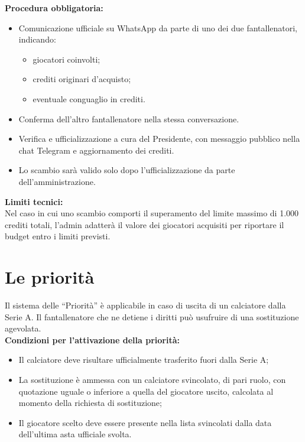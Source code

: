 \noindent \textbf{Procedura obbligatoria:}
\begin{itemize}
  \item Comunicazione ufficiale su WhatsApp da parte di uno dei due fantallenatori, indicando:
  \begin{itemize}
    \item giocatori coinvolti;
    \item crediti originari d’acquisto;
    \item eventuale conguaglio in crediti.
  \end{itemize}
  \item Conferma dell’altro fantallenatore nella stessa conversazione.
  \item Verifica e ufficializzazione a cura del Presidente, con messaggio pubblico nella chat Telegram e aggiornamento dei crediti.
  \item Lo scambio sarà valido solo dopo l’ufficializzazione da parte dell’amministrazione.
\end{itemize}

\noindent \textbf{Limiti tecnici:}\\
Nel caso in cui uno scambio comporti il superamento del limite massimo di 1.000 crediti totali, l’admin adatterà il valore dei giocatori acquisiti per riportare il budget entro i limiti previsti.

\section{Le priorità}
\label{art:5.4}

Il sistema delle “Priorità” è applicabile in caso di uscita di un calciatore dalla Serie A. Il fantallenatore che ne detiene i diritti può usufruire di una sostituzione agevolata. \\

\noindent \textbf{Condizioni per l’attivazione della priorità:}
\begin{itemize}
  \item Il calciatore deve risultare ufficialmente trasferito fuori dalla Serie A;
  \item La sostituzione è ammessa con un calciatore svincolato, di pari ruolo, con quotazione uguale o inferiore a quella del giocatore uscito, calcolata al momento della richiesta di sostituzione;
  \item Il giocatore scelto deve essere presente nella lista svincolati dalla data dell’ultima asta ufficiale svolta.
\end{itemize}

